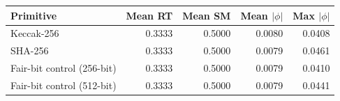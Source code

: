 \begin{tabular}{lrrrr}
\hline
Primitive & Mean RT & Mean SM & Mean $|\phi|$ & Max $|\phi|$ \\
\hline
Keccak-256 & 0.3333 & 0.5000 & 0.0080 & 0.0408 \\
SHA-256 & 0.3333 & 0.5000 & 0.0079 & 0.0461 \\
Fair-bit control (256-bit) & 0.3333 & 0.5000 & 0.0079 & 0.0410 \\
Fair-bit control (512-bit) & 0.3333 & 0.5000 & 0.0079 & 0.0441 \\
\hline
\end{tabular}
